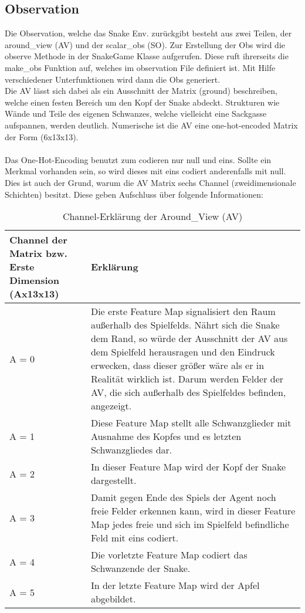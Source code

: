 \subsection{Observation}
Die Observation, welche das Snake Env. zurückgibt besteht aus zwei Teilen, der around\_view (AV) und der scalar\_obs (SO). Zur Erstellung der Obs wird die observe Methode in der SnakeGame Klasse aufgerufen. Diese ruft ihrerseits die make\_obs Funktion auf, welches im observation File definiert ist. Mit Hilfe verschiedener Unterfunktionen wird dann die Obs generiert.\\
Die AV lässt sich dabei als ein Ausschnitt der Matrix (ground) beschreiben, welche einen festen Bereich um den Kopf der Snake abdeckt.
Strukturen wie Wände und Teile des eigenen Schwanzes, welche vielleicht eine Sackgasse aufspannen, werden deutlich. Numerische ist die AV eine one-hot-encoded Matrix der Form (6x13x13).\\
\\Das One-Hot-Encoding benutzt zum codieren nur null und eins. Sollte ein Merkmal vorhanden sein, so wird dieses mit eins codiert anderenfalls mit null.\\
Dies ist auch der Grund, warum die AV Matrix sechs Channel (zweidimensionale Schichten) besitzt. Diese geben Aufschluss über folgende Informationen:
\begin{longtable}[h]{|p{4cm}|p{\linewidth - 5cm}|}
	\caption{Channel-Erklärung der Around\_View (AV)}
	\label{tab:around_view} 
	\endfirsthead
	\endhead
	\hline
	Channel der Matrix bzw. Erste Dimension (Ax13x13) & Erklärung \\
	\hline
	A = 0 & Die erste Feature Map signalisiert den Raum außerhalb des Spielfelds. Nährt sich die Snake dem Rand, so würde der Ausschnitt der AV aus dem Spielfeld herausragen und den Eindruck erwecken, dass dieser größer wäre als er in Realität wirklich ist. Darum werden Felder der AV, die sich außerhalb des Spielfeldes befinden, angezeigt.\\
	\hline
	A = 1 & Diese Feature Map stellt alle Schwanzglieder mit Ausnahme des Kopfes und es letzten Schwanzgliedes dar. \\
	\hline
	A = 2 & In dieser Feature Map wird der Kopf der Snake dargestellt. \\
	\hline
	A = 3 & Damit gegen Ende des Spiels der Agent noch freie Felder erkennen kann, wird in dieser Feature Map jedes freie und sich im Spielfeld befindliche Feld mit eins codiert. \\
	\hline
	A = 4 & Die vorletzte Feature Map codiert das Schwanzende der Snake. \\
	\hline
	A = 5 & In der letzte Feature Map wird der Apfel abgebildet. \\
	\hline
\end{longtable}

